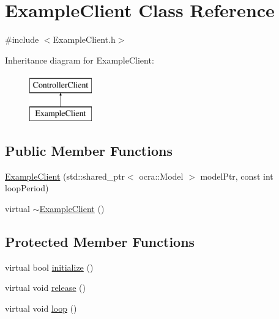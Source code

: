 \hypertarget{classExampleClient}{}\section{Example\+Client Class Reference}
\label{classExampleClient}


{\ttfamily \#include $<$Example\+Client.\+h$>$}

Inheritance diagram for Example\+Client\+:\begin{figure}[H]
\begin{center}
\leavevmode
\includegraphics[height=2.000000cm]{classExampleClient}
\end{center}
\end{figure}
\subsection*{Public Member Functions}
\begin{DoxyCompactItemize}
\item 
\hyperlink{classExampleClient_aed7d851662cba1484ecf1db8161d6e62}{Example\+Client} (std\+::shared\+\_\+ptr$<$ ocra\+::\+Model $>$ model\+Ptr, const int loop\+Period)
\item 
virtual \hyperlink{classExampleClient_abdca7dbe5fdab81d7d661a677e5ccd14}{$\sim$\+Example\+Client} ()
\end{DoxyCompactItemize}
\subsection*{Protected Member Functions}
\begin{DoxyCompactItemize}
\item 
virtual bool \hyperlink{classExampleClient_ad504d1d87997fc95bfeca6aa925a4fa6}{initialize} ()
\item 
virtual void \hyperlink{classExampleClient_a5acf25784c1c5b51c2c085327f195002}{release} ()
\item 
virtual void \hyperlink{classExampleClient_afb58f3425aafe2d4c38195cb3c667dbc}{loop} ()
\end{DoxyCompactItemize}
